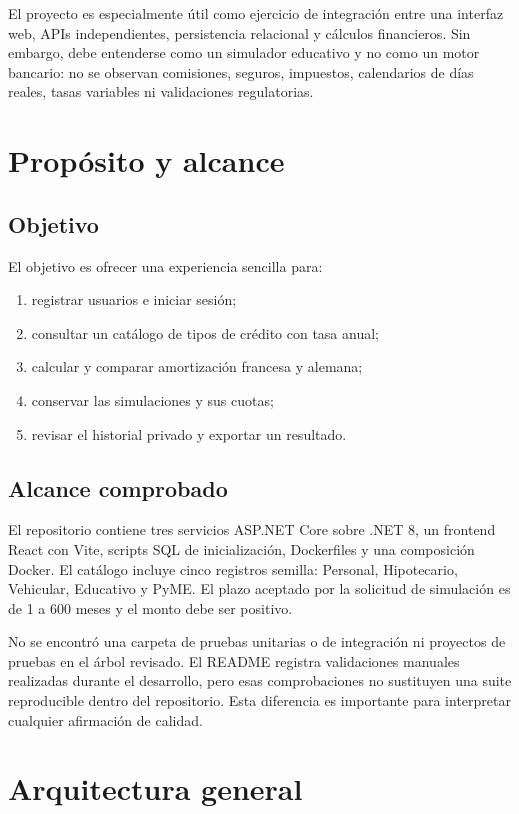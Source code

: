 \documentclass[12pt,a4paper]{article}
\begin{document}
El proyecto es especialmente útil como ejercicio de integración entre una
interfaz web, APIs independientes, persistencia relacional y cálculos
financieros. Sin embargo, debe entenderse como un simulador educativo y no
como un motor bancario: no se observan comisiones, seguros, impuestos,
calendarios de días reales, tasas variables ni validaciones regulatorias.

\section{Propósito y alcance}

\subsection{Objetivo}

El objetivo es ofrecer una experiencia sencilla para:
\begin{enumerate}[label=\arabic*.]
  \item registrar usuarios e iniciar sesión;
  \item consultar un catálogo de tipos de crédito con tasa anual;
  \item calcular y comparar amortización francesa y alemana;
  \item conservar las simulaciones y sus cuotas;
  \item revisar el historial privado y exportar un resultado.
\end{enumerate}

\subsection{Alcance comprobado}

El repositorio contiene tres servicios ASP.NET Core sobre .NET 8, un frontend
React con Vite, scripts SQL de inicialización, Dockerfiles y una composición
Docker. El catálogo incluye cinco registros semilla: Personal, Hipotecario,
Vehicular, Educativo y PyME. El plazo aceptado por la solicitud de simulación
es de 1 a 600 meses y el monto debe ser positivo.

No se encontró una carpeta de pruebas unitarias o de integración ni proyectos
de pruebas en el árbol revisado. El README registra validaciones manuales
realizadas durante el desarrollo, pero esas comprobaciones no sustituyen una
suite reproducible dentro del repositorio. Esta diferencia es importante para
interpretar cualquier afirmación de calidad.

\section{Arquitectura general}
\end{document}
